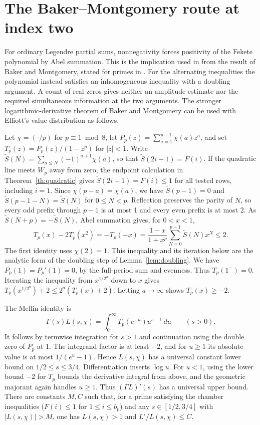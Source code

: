\documentclass[11pt,reqno]{amsart}
\begin{document}
\section{The Baker--Montgomery route at index two}\label{app:bm}
For ordinary Legendre partial sums, nonnegativity forces positivity of the Fekete polynomial by Abel summation. This is the implication used in \cite[Theorem~1]{Kal} from the result of Baker and Montgomery, stated for primes in \cite[p.~866]{CGPS}. For the alternating inequalities the polynomial instead satisfies an inhomogeneous inequality with a doubling argument. A count of real zeros gives neither an amplitude estimate nor the required simultaneous information at the two arguments. The stronger logarithmic-derivative theorem of Baker and Montgomery can be used with Elliott's value distribution as follows.

Let \(\chi=(\cdot/p)\) for \(p\equiv1\bmod8\), let \(P_p(z)=\sum_{a=1}^{p-1}\chi(a)z^a\), and set \(T_p(z)=P_p(z)/(1-z^p)\) for \(|z|<1\). Write \(\widetilde S(N)=\sum_{a\le N}(-1)^{a+1}\chi(a)\), so that \(\widetilde S(2i-1)=F(i)\). If the quadratic line meets \(W_p\) away from zero, the endpoint calculation in Theorem~\ref{th:quadratic} gives \(\widetilde S(2i-1)=F(i)\le1\) for all tested rows, including \(i=1\). Since \(\chi(p-a)=\chi(a)\), we have \(\widetilde S(p-1)=0\) and \(\widetilde S(p-1-N)=\widetilde S(N)\) for \(0\le N<p\). Reflection preserves the parity of \(N\), so every odd prefix through \(p-1\) is at most 1 and every even prefix is at most 2. As \(\widetilde S(N+p)=-\widetilde S(N)\), Abel summation gives, for \(0<x<1\),
\[
 T_p(x)-2T_p(x^2)
 =-T_p(-x)=\frac{1-x}{1+x^p}\sum_{N=0}^{p-1} \widetilde S(N)x^N\le2.
\]
The first identity uses \(\chi(2)=1\). This inequality and its iteration below are the analytic form of the doubling step of Lemma~\ref{lem:doubling}. We have \(P_p(1)=P_p'(1)=0\), by the full-period sum and evenness. Thus \(T_p(1^-)=0\). Iterating the inequality from \(x^{1/2^a}\) down to \(x\) gives \(T_p(x^{1/2^a})+2\le 2^a(T_p(x)+2)\). Letting \(a\to\infty\) shows \(T_p(x)\ge-2\).

The Mellin identity is
\[
 \Gamma(s)L(s,\chi)=\int_0^\infty T_p(e^{-u})u^{s-1}\,du
 \qquad(s>0).
\]
It follows by termwise integration for \(s>1\) and continuation using the double zero of \(P_p\) at 1. The integrand factor is at least \(-2\), and for \(u\ge1\) its absolute value is at most \(1/(e^u-1)\). Hence \(L(s,\chi)\) has a universal constant lower bound on \(1/2\le s\le3/4\). Differentiation inserts \(\log u\). For \(u<1\), using the lower bound \(-2\) for \(T_p\) bounds the derivative integral from above, and the geometric majorant again handles \(u\ge1\). Thus \((\Gamma L)'(s)\) has a universal upper bound. There are constants \(M,C\) such that, for a prime satisfying the chamber inequalities (\(F(i)\le1\) for \(1\le i\le b_p\)) and any \(s\in[1/2,3/4]\) with \(|L(s,\chi)|>M\), one has \(L(s,\chi)>1\) and \(L'/L(s,\chi)\le C\).
\end{document}
